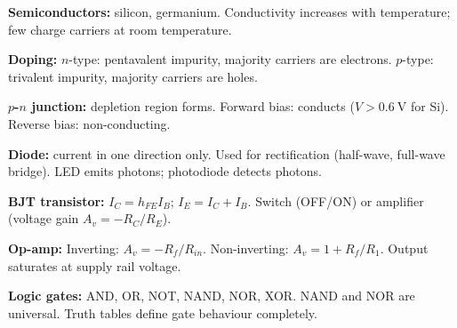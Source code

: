 \begin{summarybox}
\textbf{Semiconductors:} silicon, germanium.
Conductivity increases with temperature; few charge
carriers at room temperature.

\textbf{Doping:}
$n$-type: pentavalent impurity, majority carriers
are electrons.
$p$-type: trivalent impurity, majority carriers
are holes.

\textbf{$p$-$n$ junction:} depletion region forms.
Forward bias: conducts ($V > 0.6\ \text{V}$ for Si).
Reverse bias: non-conducting.

\textbf{Diode:} current in one direction only.
Used for rectification (half-wave, full-wave bridge).
LED emits photons; photodiode detects photons.

\textbf{BJT transistor:}
$I_C = h_{FE} I_B$; $I_E = I_C + I_B$.
Switch (OFF/ON) or amplifier (voltage gain
$A_v = -R_C/R_E$).

\textbf{Op-amp:}
Inverting: $A_v = -R_f/R_{in}$.
Non-inverting: $A_v = 1 + R_f/R_1$.
Output saturates at supply rail voltage.

\textbf{Logic gates:} AND, OR, NOT, NAND, NOR, XOR.
NAND and NOR are universal.
Truth tables define gate behaviour completely.
\end{summarybox}

